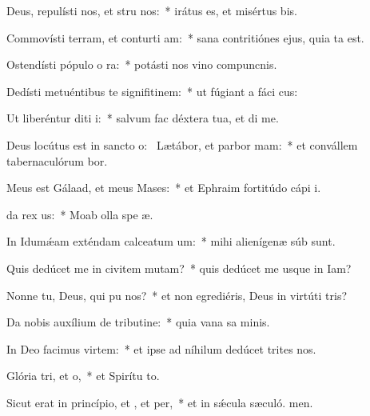 \item Deus, repulísti nos, et stru nos:~* irátus es, et misértus  bis.
\item Commovísti terram, et conturti am:~* sana contritiónes ejus, quia ta est.
\item Ostendísti pópulo o ra:~* potásti nos vino compuncnis.
\item Dedísti metuéntibus te signifitinem:~* ut fúgiant a fáci cus:
\item Ut liberéntur diti i:~* salvum fac déxtera tua, et di me.
\item Deus locútus est in sancto o:~\pscross{} Lætábor, et parbor mam:~* et convállem tabernaculórum bor.
\item Meus est Gálaad, et meus  Mases:~* et Ephraim fortitúdo cápi i.
\item {}da rex us:~* Moab olla spe æ.
\item In Idumǽam exténdam calceatum um:~* mihi alienígenæ súb sunt.
\item Quis dedúcet me in civitem mutam?~* quis dedúcet me usque in Iam?
\item Nonne tu, Deus, qui pu nos?~* et non egrediéris, Deus in virtúti tris?
\item Da nobis auxílium de tributine:~* quia vana sa minis.
\item In Deo facimus virtem:~* et ipse ad níhilum dedúcet trites nos.
\item Glória tri, et o,~* et Spirítu to.
\item Sicut erat in princípio, et , et per,~* et in sǽcula sæculó. men.
